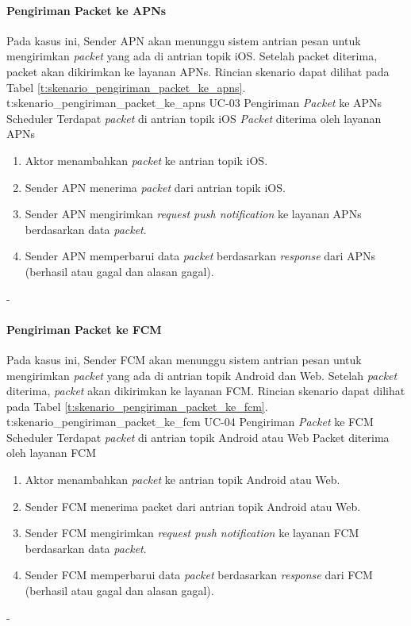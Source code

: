 \paragraph{Pengiriman Packet ke APNs}
\par Pada kasus ini, Sender APN akan menunggu sistem antrian pesan untuk mengirimkan \textit{packet} yang ada di antrian topik iOS. Setelah packet diterima, packet akan dikirimkan ke layanan APNs. Rincian skenario dapat dilihat pada Tabel \ref{t:skenario_pengiriman_packet_ke_apns}.
\tableUcDesc
{t:skenario_pengiriman_packet_ke_apns}
{UC-03}
{Pengiriman \textit{Packet} ke APNs}
{Scheduler}
{Terdapat \textit{packet} di antrian topik iOS}
{\textit{Packet} diterima oleh layanan APNs}
{
\begin{enumerate}
	\item Aktor menambahkan \textit{packet} ke antrian topik iOS.
    \item Sender APN menerima \textit{packet} dari antrian topik iOS.
    \item Sender APN mengirimkan \textit{request push notification} ke layanan APNs berdasarkan data \textit{packet}.
    \item Sender APN memperbarui data \textit{packet} berdasarkan \textit{response} dari APNs (berhasil atau gagal dan alasan gagal).
\end{enumerate}
}
{-}

\paragraph{Pengiriman Packet ke FCM}
\par Pada kasus ini, Sender FCM akan menunggu sistem antrian pesan untuk mengirimkan \textit{packet} yang ada di antrian topik Android dan Web. Setelah \textit{packet} diterima, \textit{packet} akan dikirimkan ke layanan FCM. Rincian skenario dapat dilihat pada Tabel \ref{t:skenario_pengiriman_packet_ke_fcm}.
\tableUcDesc
{t:skenario_pengiriman_packet_ke_fcm}
{UC-04}
{Pengiriman \textit{Packet} ke FCM}
{Scheduler}
{Terdapat \textit{packet} di antrian topik Android atau Web}
{Packet diterima oleh layanan FCM}
{
\begin{enumerate}
	\item Aktor menambahkan \textit{packet} ke antrian topik Android atau Web.
    \item Sender FCM menerima packet dari antrian topik Android atau Web.
    \item Sender FCM mengirimkan \textit{request push notification} ke layanan FCM berdasarkan data \textit{packet}.
    \item Sender FCM memperbarui data \textit{packet} berdasarkan \textit{response} dari FCM (berhasil atau gagal dan alasan gagal).
\end{enumerate}
}
{-}

